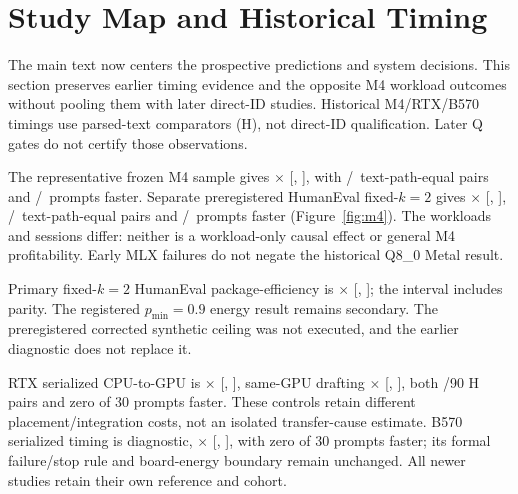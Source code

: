 \documentclass{article}
\begin{document}
\section{Study Map and Historical Timing}
\label{app:history}
The main text now centers the prospective predictions and system decisions. This section preserves earlier timing evidence and the opposite M4 workload outcomes without pooling them with later direct-ID studies. Historical M4/RTX/B570 timings use parsed-text comparators (H), not direct-ID qualification. Later Q gates do not certify those observations.



The representative frozen M4 sample gives \MRepSpeed$\times$ [\MRepLo, \MRepHi], with \MRepExact/\MRepPairs\ text-path-equal pairs and \MRepFaster/\MRepN\ prompts faster. Separate preregistered HumanEval fixed-$k=2$ gives \MHEspeed$\times$ [\MHElo, \MHEhi], \MHEexact/\MHEpairs\ text-path-equal pairs and \MHEfaster/\MHEprompts\ prompts faster (Figure~\ref{fig:m4}). The workloads and sessions differ: neither is a workload-only causal effect or general M4 profitability. Early MLX failures do not negate the historical Q8\_0 Metal result.

Primary fixed-$k=2$ HumanEval package-efficiency is \MHEenergy$\times$ [\MHEenergyLo, \MHEenergyHi]; the interval includes parity. The registered $p_{\min}=0.9$ energy result remains secondary. The preregistered corrected synthetic ceiling was not executed, and the earlier diagnostic does not replace it.

RTX serialized CPU-to-GPU is \RTXcpuSpeed$\times$ [\RTXcpuLo, \RTXcpuHi], same-GPU drafting \RTXgpuSpeed$\times$ [\RTXgpuLo, \RTXgpuHi], both \RTXexact/90 H pairs and zero of 30 prompts faster. These controls retain different placement/integration costs, not an isolated transfer-cause estimate. B570 serialized timing is diagnostic, \BSpeed$\times$ [\BLo, \BHi], with zero of 30 prompts faster; its formal failure/stop rule and board-energy boundary remain unchanged. All newer studies retain their own reference and cohort.



\clearpage


\end{document}
